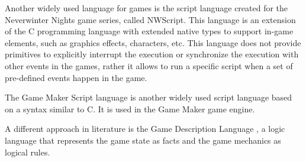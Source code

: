 Another widely used language for games is the script language created
for the Neverwinter Nights game series, called NWScript. This language
is an extension of the C programming language with extended native
types to support in-game elements, such as graphics effects,
characters, etc. This language does not provide primitives to
explicitly interrupt the execution or synchronize the execution with
other events in the games, rather it allows to run a specific script
when a set of pre-defined events happen in the game.

The Game Maker Script language \cite{GAME_MAKER} is another widely
used script language based on a syntax similar to C. It is used in the
Game Maker game engine.

A different approach in literature is the Game Description Language
\cite{GAME_DESCRIPTION_LANGUAGE}, a logic language that represents the
game state as facts and the game mechanics as logical rules.